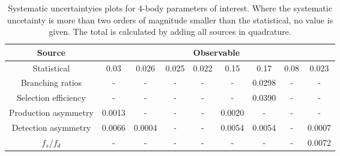\begin{table}
  \centering
  \begin{tabular}{ccccccccc}
      \toprule
      Source & \multicolumn{8}{c}{Observable} \\
      \midrule
      Statistical & 0.03 & 0.026 & 0.025 & 0.022 & 0.15 & 0.17 & 0.08 & 0.023 \\
      \midrule
      Branching ratios & \-- & \-- & \-- & \-- & \-- & 0.0298 & \-- & \-- \\
      Selection efficiency & \-- & \-- & \-- & \-- & \-- & 0.0390 & \-- & \-- \\
      Production asymmetry & 0.0013 & \-- & \-- & \-- & 0.0020 & \-- & \-- & \-- \\
      Detection asymmetry & 0.0066 & 0.0004 & \-- & \-- & 0.0054 & 0.0054 & \-- & 0.0007 \\
      $f_s/f_d$ & \-- & \-- & \-- & \-- & \-- & \-- & \-- & 0.0072 \\
      \bottomrule
  \end{tabular}
  \caption{Systematic uncertaintyies plots for 4-body parameters of interest. Where the systematic uncetainty is more than two orders of magnitude smaller than the statistical, no value is given. The total is calculated by adding all sources in quadrature.}
\label{tab:fourBody_systematics}
\end{table}
